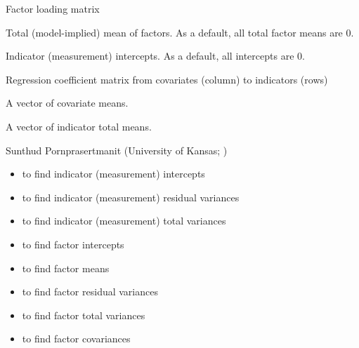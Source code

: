 \documentclass[a4paper]{book}
\begin{document}
\begin{Arguments}
\begin{ldescription}
\item[\code{lambda}] 
Factor loading matrix

\item[\code{factorMean}] 
Total (model-implied) mean of factors. As a default, all total factor means are 0.

\item[\code{tau}] 
Indicator (measurement) intercepts. As a default, all intercepts are 0.

\item[\code{kappa}] 
Regression coefficient matrix from covariates (column) to indicators (rows)

\item[\code{covmean}] 
A vector of covariate means.

\end{ldescription}
\end{Arguments}
%
\begin{Value}
A vector of indicator total means.
\end{Value}
%
\begin{Author}\relax
Sunthud Pornprasertmanit (University of Kansas; )
\end{Author}
%
\begin{SeeAlso}\relax
\begin{itemize}

\item {} to find indicator (measurement) intercepts
\item {} to find indicator (measurement) residual variances
\item {} to find indicator (measurement) total variances
\item {} to find factor intercepts
\item {} to find factor means
\item {} to find factor residual variances
\item {} to find factor total variances
\item {} to find factor covariances

\end{itemize}

\end{SeeAlso}
\end{document}
